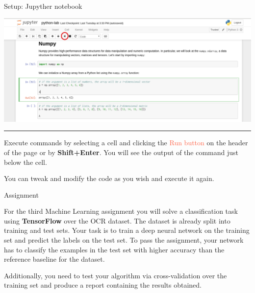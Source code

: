 \documentclass[10pt]{beamer}
\begin{document}

\begin{frame}{Setup: Jupyther notebook}
\centering

\includegraphics[width=\textwidth]{figures/click1}

\vspace{0.1in}
\hrule
\vspace{0.1in}

Execute commands by selecting a cell and clicking the \textcolor{tomato}{Run
button} on the header of the page or by \textbf{Shift+Enter}. You will see the
output of the command just below the cell.

You can tweak and modify the code as you wish and execute it again.

\end{frame}


\begin{frame}{Assignment}
\centering

For the third Machine Learning assignment you will solve a classification task
using \textbf{TensorFlow} over the OCR dataset. The dataset is already split
into training and test sets. Your task is to train a deep
neural network on the training set and predict the labels on the test set. To
pass the assignment, your network has to classify the examples in the test
set with higher accuracy than the reference baseline for the dataset.

Additionally, you need to test your algorithm via cross-validation over the
training set and produce a report containing the results obtained.

\end{frame}

\end{document}
